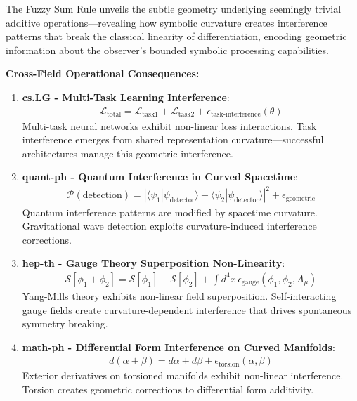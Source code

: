 \begin{scholium}
\label{scholium:bk4_symbolic_interference}
The Fuzzy Sum Rule unveils the subtle geometry underlying seemingly trivial additive operations—revealing how symbolic curvature creates interference patterns that break the classical linearity of differentiation, encoding geometric information about the observer's bounded symbolic processing capabilities.

\textbf{Cross-Field Operational Consequences:}

\begin{enumerate}
\item \textbf{cs.LG - Multi-Task Learning Interference}: 
   \begin{align}
   \mathcal{L}_{\text{total}} = \mathcal{L}_{\text{task1}} + \mathcal{L}_{\text{task2}} + \epsilon_{\text{task-interference}}(\theta)
   \end{align}
   Multi-task neural networks exhibit non-linear loss interactions. Task interference emerges from shared representation curvature—successful architectures manage this geometric interference.

\item \textbf{quant-ph - Quantum Interference in Curved Spacetime}:
   \begin{align}
   \mathcal{P}(\text{detection}) = |\langle \psi_1 | \psi_{\text{detector}} \rangle + \langle \psi_2 | \psi_{\text{detector}} \rangle|^2 + \epsilon_{\text{geometric}}
   \end{align}
   Quantum interference patterns are modified by spacetime curvature. Gravitational wave detection exploits curvature-induced interference corrections.

\item \textbf{hep-th - Gauge Theory Superposition Non-Linearity}:
   \begin{align}
   \mathcal{S}[\phi_1 + \phi_2] = \mathcal{S}[\phi_1] + \mathcal{S}[\phi_2] + \int d^4x \, \epsilon_{\text{gauge}}(\phi_1, \phi_2, A_\mu)
   \end{align}
   Yang-Mills theory exhibits non-linear field superposition. Self-interacting gauge fields create curvature-dependent interference that drives spontaneous symmetry breaking.

\item \textbf{math-ph - Differential Form Interference on Curved Manifolds}:
   \begin{align}
   d(\alpha + \beta) = d\alpha + d\beta + \epsilon_{\text{torsion}}(\alpha, \beta)
   \end{align}
   Exterior derivatives on torsioned manifolds exhibit non-linear interference. Torsion creates geometric corrections to differential form additivity.


\end{enumerate}
\end{scholium}
